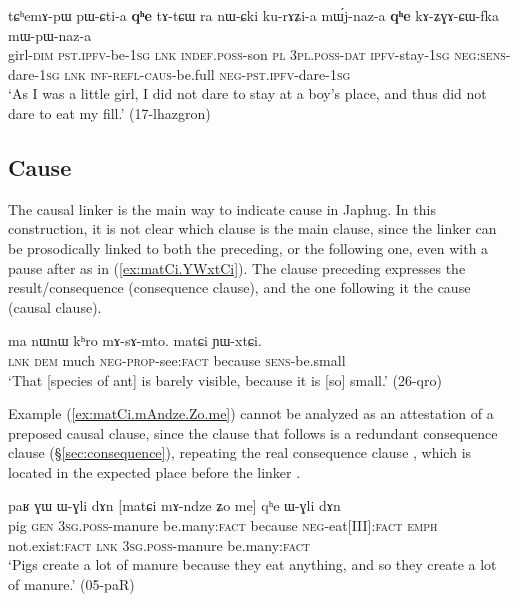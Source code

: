 \begin{exe}
\ex \label{ex:pWCtia.qhe.qhe}
\gll tɕʰemɤ-pɯ pɯ-ɕti-a \textbf{qʰe} tɤ-tɕɯ ra nɯ-ɕki ku-rɤʑi-a mɯ́j-naz-a \textbf{qʰe} kɤ-ʑɣɤ-ɕɯ-fka mɯ-pɯ-naz-a \\
girl-\textsc{dim} \textsc{pst}.\textsc{ipfv}-be-\textsc{1sg} \textsc{lnk} \textsc{indef}.\textsc{poss}-son \textsc{pl} \textsc{3pl}.\textsc{poss}-\textsc{dat} \textsc{ipfv}-stay-\textsc{1sg} \textsc{neg}:\textsc{sens}-dare-\textsc{1sg} \textsc{lnk} \textsc{inf}-\textsc{refl}-\textsc{caus}-be.full \textsc{neg}-\textsc{pst}.\textsc{ipfv}-dare-\textsc{1sg} \\
\glt `As I was a little girl, I did not dare to stay at a boy's place, and thus did not dare to eat my fill.' (17-lhazgron)
\end{exe}
 
 \subsection{Cause} \label{sec:causal.clauses}
The causal linker  is the main way to indicate cause in Japhug. In this construction, it is not clear which clause is the main clause, since the linker can be prosodically linked to both the preceding, or the following one, even with a pause after  as in (\ref{ex:matCi.YWxtCi}). The clause preceding  expresses the result/consequence (consequence clause), and the one following it the cause (causal clause).


\begin{exe}
\ex \label{ex:matCi.YWxtCi}
\gll ma nɯnɯ kʰro mɤ-sɤ-mto. matɕi ɲɯ-xtɕi. \\
\textsc{lnk} \textsc{dem} much \textsc{neg}-\textsc{prop}-see:\textsc{fact} because \textsc{sens}-be.small \\
\glt `That [species of ant] is barely visible, because it is [so] small.'  (26-qro)
\end{exe} 

Example (\ref{ex:matCi.mAndze.Zo.me}) cannot be analyzed as an attestation of a preposed  causal clause, since the clause that follows  is a redundant consequence clause (§\ref{sec:consequence}), repeating the real consequence clause , which is located in the expected place before the linker .


\begin{exe}
\ex \label{ex:matCi.mAndze.Zo.me}
\gll paʁ ɣɯ ɯ-ɣli dɤn [matɕi mɤ-ndze ʑo me] qʰe ɯ-ɣli dɤn  \\
pig \textsc{gen} \textsc{3sg}.\textsc{poss}-manure be.many:\textsc{fact} because \textsc{neg}-eat[III]:\textsc{fact} \textsc{emph} not.exist:\textsc{fact} \textsc{lnk} \textsc{3sg}.\textsc{poss}-manure  be.many:\textsc{fact} \\
\glt `Pigs create a lot of manure because they eat anything, and so they create a lot of manure.' (05-paR)
\end{exe}

